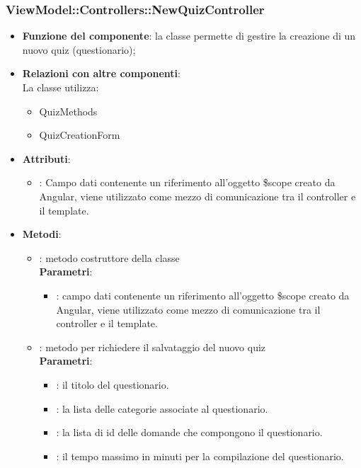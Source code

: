 \subsubsection{ViewModel::Controllers::NewQuizController}
\begin{itemize}
\item\textbf{Funzione del componente}: la classe permette di gestire la creazione di un nuovo quiz (questionario);
\item\textbf{Relazioni con altre componenti}: \\
La classe utilizza:
	\begin{itemize}
		\item QuizMethods
		\item QuizCreationForm
	\end{itemize}
\item\textbf{Attributi}:
	\begin{itemize}
		\item{}: Campo dati contenente un riferimento all'oggetto \$scope creato da Angular, viene utilizzato come mezzo di comunicazione tra il controller e il template.\\
	\end{itemize}
\item\textbf{Metodi}:
	\begin{itemize}
		\item{}: metodo costruttore della classe\\
		\textbf{Parametri}:
			\begin{itemize}
				\item{}: campo dati contenente un riferimento all’oggetto \$scope creato da Angular, viene utilizzato come mezzo di comunicazione tra il controller e il template.\\
			\end{itemize}
		\item{}: metodo per richiedere il salvataggio del nuovo quiz\\
		\textbf{Parametri}:
			\begin{itemize}
				\item{}: il titolo del questionario.\\
				\item{}: la lista delle categorie associate al questionario.\\
				\item{}: la lista di id delle domande che compongono il questionario.\\
				\item{}: il tempo massimo in minuti per la compilazione del questionario.\\
			\end{itemize}
	\end{itemize}
\end{itemize}

